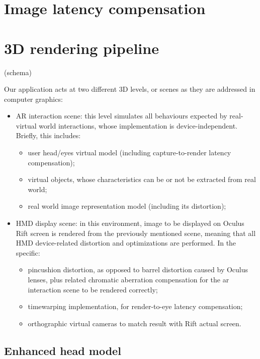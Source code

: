 \section{Image latency compensation}

\section{3D rendering pipeline}

(schema)

Our application acts at two different 3D levels, or scenes as they are addressed in computer graphics:
\begin{itemize}
\item AR interaction scene: this level simulates all behaviours expected by real-virtual world interactions, whose implementation is device-independent. Briefly, this includes:
\begin{itemize}
\item user head/eyes virtual model (including capture-to-render latency compensation);
\item virtual objects, whose characteristics can be or not be extracted from real world;
\item real world image representation model (including its distortion);
\end{itemize}
\item HMD display scene: in this environment, image to be displayed on Oculus Rift screen is rendered from the previously mentioned scene, meaning that all HMD device-related distortion and optimizations are performed. In the specific:
\begin{itemize}
\item pincushion distortion, as opposed to barrel distortion caused by Oculus lenses, plus related chromatic aberration compensation for the ar interaction scene to be rendered correctly;
\item timewarping implementation, for render-to-eye latency compensation;
\item orthographic virtual cameras to match result with Rift actual screen.
\end{itemize}
\end{itemize}

\subsection{Enhanced head model}

